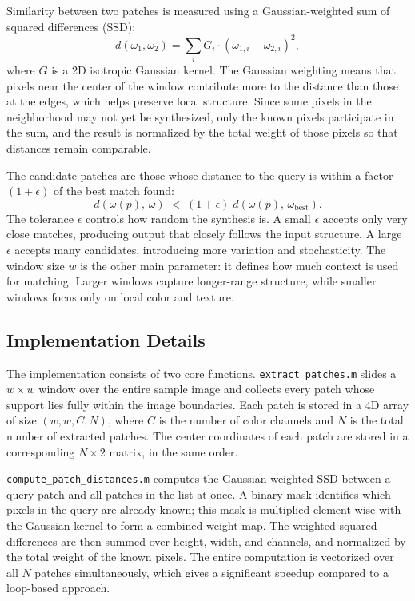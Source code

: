 \documentclass{article}
\begin{document}
Similarity between two patches is measured using a Gaussian-weighted sum of squared differences (SSD):
\begin{equation}
    d(\omega_1, \omega_2) = \sum_{i} G_i \cdot (\omega_{1,i} - \omega_{2,i})^2,
    \label{eq:ssd}
\end{equation}
where $G$ is a 2D isotropic Gaussian kernel. The Gaussian weighting means that pixels near the center of the window contribute more to the distance than those at the edges, which helps preserve local structure. Since some pixels in the neighborhood may not yet be synthesized, only the known pixels participate in the sum, and the result is normalized by the total weight of those pixels so that distances remain comparable.

The candidate patches are those whose distance to the query is within a factor $(1 + \epsilon)$ of the best match found:
\begin{equation}
    d(\omega(p),\, \omega) \;<\; (1+\epsilon)\; d(\omega(p),\, \omega_{\text{best}}).
\end{equation}
The tolerance $\epsilon$ controls how random the synthesis is. A small $\epsilon$ accepts only very close matches, producing output that closely follows the input structure. A large $\epsilon$ accepts many candidates, introducing more variation and stochasticity. The window size $w$ is the other main parameter: it defines how much context is used for matching. Larger windows capture longer-range structure, while smaller windows focus only on local color and texture.

\subsection{Implementation Details}

The implementation consists of two core functions. \texttt{extract\_patches.m} slides a $w \times w$ window over the entire sample image and collects every patch whose support lies fully within the image boundaries. Each patch is stored in a 4D array of size $(w, w, C, N)$, where $C$ is the number of color channels and $N$ is the total number of extracted patches. The center coordinates of each patch are stored in a corresponding $N \times 2$ matrix, in the same order.

\texttt{compute\_patch\_distances.m} computes the Gaussian-weighted SSD between a query patch and all patches in the list at once. A binary mask identifies which pixels in the query are already known; this mask is multiplied element-wise with the Gaussian kernel to form a combined weight map. The weighted squared differences are then summed over height, width, and channels, and normalized by the total weight of the known pixels. The entire computation is vectorized over all $N$ patches simultaneously, which gives a significant speedup compared to a loop-based approach.
\end{document}
